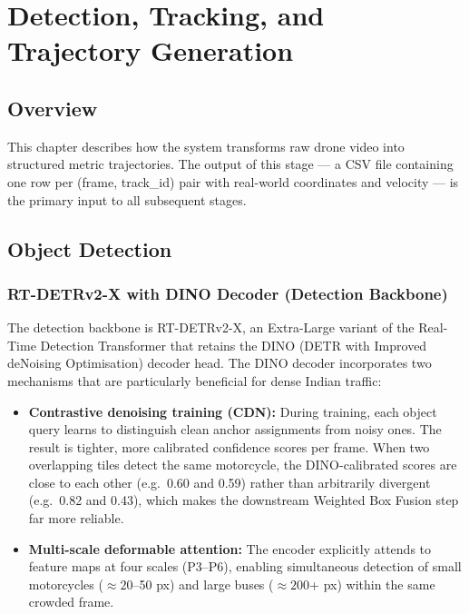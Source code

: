 \chapter{Detection, Tracking, and Trajectory Generation}
\label{chap:detection}

\section{Overview}

This chapter describes how the system transforms raw drone video into structured metric
trajectories.  The output of this stage --- a CSV file containing one row per
(frame, track\_id) pair with real-world coordinates and velocity --- is the primary input
to all subsequent stages.

\section{Object Detection}

\subsection{RT-DETRv2-X with DINO Decoder (Detection Backbone)}

The detection backbone is RT-DETRv2-X, an Extra-Large variant of the Real-Time Detection
Transformer that retains the DINO (DETR with Improved deNoising Optimisation) decoder head.
The DINO decoder incorporates two mechanisms that are particularly beneficial for dense
Indian traffic:

\begin{itemize}
    \item \textbf{Contrastive denoising training (CDN):}
          During training, each object query learns to distinguish clean anchor assignments
          from noisy ones.  The result is tighter, more calibrated confidence scores
          per frame.  When two overlapping tiles detect the same motorcycle, the
          DINO-calibrated scores are close to each other (e.g.\ 0.60 and 0.59) rather than
          arbitrarily divergent (e.g.\ 0.82 and 0.43), which makes the downstream
          Weighted Box Fusion step far more reliable.

    \item \textbf{Multi-scale deformable attention:}
          The encoder explicitly attends to feature maps at four scales (P3--P6),
          enabling simultaneous detection of small motorcycles ($\approx 20$--50 px) and
          large buses ($\approx 200$+ px) within the same crowded frame.
\end{itemize}

